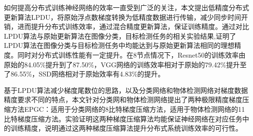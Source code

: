 \begin{cabstract}

如何提高分布式训练神经网络的效率一直受到广泛的关注，本文提出低精度分布式更新算法LPDU，将原始浮点数梯度转换为低精度数据进行传输，减少同步时间开销，进而提升分布式训练效率，通过混合精度更新算法，保证训练精度。通过对比LPDU算法与原始更新算法在图像分类，目标检测任务的相关实验结果,证明了LPDU算法在图像分类与目标检测任务中均能达到与原始更新算法相同的理想精度。同时对分布式训练性能有一定提升。在8节点情况下，Resnet50的训练效率由原始的84.05\%提升到了87.50\%，VGG网络的训练效率相对于原始的79.42\%提升至了86.55\%，SSD网络相对于原始效率有4.83\%的提升。

基于LPDU算法减少梯度尾数位的思路，以及分类网络和物体检测网络对梯度数据精度要求不同的特点，本文针对分类网和物体检测网络提出了两种极限精度梯度压缩方法EPGC：适用于分类网络的8比特梯度压缩方法，适用于物体检测网络的11比特梯度压缩方法。实验证明这两种梯度压缩算法均能保证神经网络在对应任务中的训练精度，说明通过这两种梯度压缩算法提升分布式系统训练效率的可行性。

\end{cabstract}

